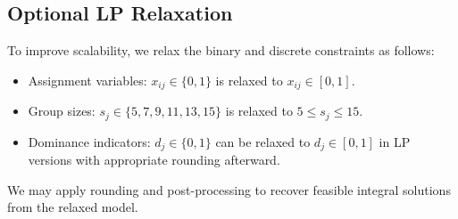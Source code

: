 \subsection*{Optional LP Relaxation}

To improve scalability, we relax the binary and discrete constraints as follows:
\begin{itemize}
    \item Assignment variables: \quad $x_{ij} \in \{0,1\}$ is relaxed to $x_{ij} \in [0,1]$.
    \item Group sizes: \quad $s_j \in \{5,7,9,11,13,15\}$ is relaxed to $5 \leq s_j \leq 15$.
    \item Dominance indicators: \quad $d_j \in \{0,1\}$ can be relaxed to $d_j \in [0,1]$ in LP versions with appropriate rounding afterward.
\end{itemize}
We may apply rounding and post-processing to recover feasible integral solutions from the relaxed model.
